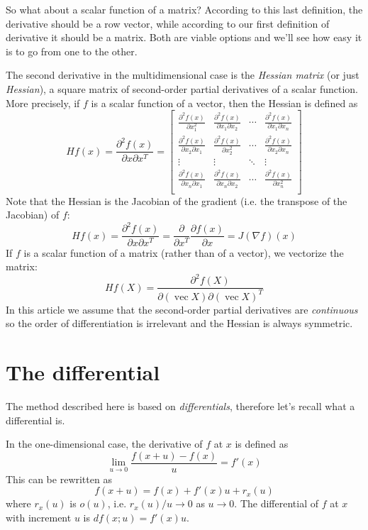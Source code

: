 \documentclass[a4paper,12pt]{article}
\begin{document}
So what about a scalar function of a matrix? According to this last definition, the derivative should be a row vector, while according to our first definition of derivative it should be a matrix. Both are viable options and we'll see how easy it is to go from one to the other.

The second derivative in the multidimensional case is the \emph{Hessian matrix} (or just \emph{Hessian}), a square matrix of second-order partial derivatives of a scalar function. More precisely, if $f$ is a scalar function of a vector, then the Hessian is defined as
$$
Hf(x) =
\frac{\partial^2f(x)}{\partial x\partial x^T} =
\begin{bmatrix}
\frac{\partial^2f(x)}{\partial x_1^2} & \frac{\partial^2f(x)}{\partial x_1\partial x_2} & \cdots & \frac{\partial^2f(x)}{\partial x_1\partial x_n} \\
\frac{\partial^2f(x)}{\partial x_2\partial x_1} & \frac{\partial^2f(x)}{\partial x_2^2} & \cdots & \frac{\partial^2f(x)}{\partial x_2\partial x_n} \\
\vdots & \vdots & \ddots & \vdots \\
\frac{\partial^2f(x)}{\partial x_n\partial x_1} & \frac{\partial^2f(x)}{\partial x_n\partial x_2} & \cdots & \frac{\partial^2f(x)}{\partial x_n^2} \\
\end{bmatrix}
$$ Note that the Hessian is the Jacobian of the gradient (i.e. the transpose of the Jacobian) of $f$:
$$ Hf(x) =
\frac{\partial^2f(x)}{\partial x\partial x^T} =
\frac{\partial}{\partial x^T}\frac{\partial f(x)}{\partial x} =
J(\nabla f)(x)
$$ If $f$ is a scalar function of a matrix (rather than of a vector), we vectorize the matrix:
$$ Hf(X) = \frac{\partial^2 f(X)}{\partial(\operatorname{vec}X)\partial(\operatorname{vec}X)^T}
$$ In this article we assume that the second-order partial derivatives are \emph{continuous} so the order of differentiation is irrelevant and the Hessian is always symmetric.

\section{The differential}

The method described here is based on \emph{differentials}, therefore let's recall what a differential is.

In the one-dimensional case, the derivative of $f$ at $x$ is defined as
$$ \lim_{u\to 0}\frac{f(x+u)-f(x)}{u}=f'(x)
$$ This can be rewritten as
$$ f(x+u) = f(x) + f'(x)u + r_x(u)
$$ where $r_x(u)$ is $o(u)$, i.e. $r_x(u)/u \to 0$ as $u\to 0$. The differential of $f$ at $x$ with increment $u$ is $df(x;u) = f'(x)u$.
\end{document}
